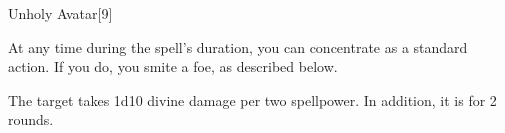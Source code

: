 
\begin{spellsection}{Unholy Avatar}[9]
    \begin{spellheader}
    \end{spellheader}
    \begin{spellcontent}
        \begin{spelltargetinginfo}
        \end{spelltargetinginfo}
        \begin{spelleffects}
            \spelleffect At any time during the spell's duration, you can concentrate as a standard action. If you do, you smite a foe, as described below.
            \spelldur \durlong
        \end{spelleffects}
    \end{spellcontent}
    \begin{spellsubcontent}
        \begin{spelltargetinginfo}
        \end{spelltargetinginfo}
        \begin{spelleffects}
            \spelleffect The target takes 1d10 divine damage per two spellpower. In addition, it is \staggered for 2 rounds.
        \end{spelleffects}
    \end{spellsubcontent}
    \begin{spellfooter}
        \miscastexplode
    \end{spellfooter}
\end{spellsection}

